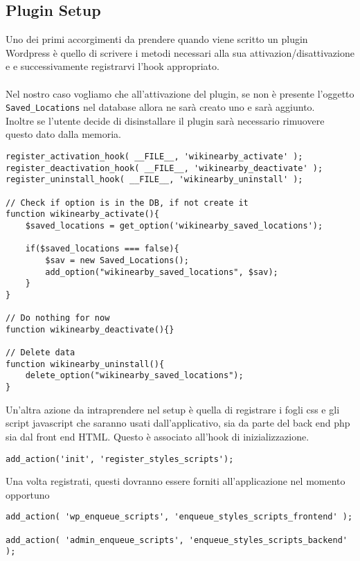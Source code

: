 \subsection*{Plugin Setup}
Uno dei primi accorgimenti da prendere quando viene scritto un plugin Wordpress è quello di scrivere i metodi necessari alla sua attivazion/disattivazione e e successivamente registrarvi l'hook appropriato.\\\\
Nel nostro caso  vogliamo che all'attivazione del plugin, se non è presente l'oggetto \texttt{Saved\_Locations} nel database allora ne sarà creato uno e sarà aggiunto. \\
Inoltre se l'utente decide di disinstallare il plugin sarà necessario rimuovere questo dato dalla memoria.\\
\begin{lstlisting}
register_activation_hook( __FILE__, 'wikinearby_activate' );
register_deactivation_hook( __FILE__, 'wikinearby_deactivate' );
register_uninstall_hook( __FILE__, 'wikinearby_uninstall' );

// Check if option is in the DB, if not create it
function wikinearby_activate(){
    $saved_locations = get_option('wikinearby_saved_locations');
	
    if($saved_locations === false){
        $sav = new Saved_Locations();
		add_option("wikinearby_saved_locations", $sav);
	}
}

// Do nothing for now
function wikinearby_deactivate(){}

// Delete data
function wikinearby_uninstall(){
	delete_option("wikinearby_saved_locations");
}
\end{lstlisting}

Un'altra azione da intraprendere nel setup è quella di registrare i fogli css e gli script javascript che saranno usati dall'applicativo, sia da parte del back end php sia dal front end HTML. Questo è associato all'hook di inizializzazione.
\begin{lstlisting}
add_action('init', 'register_styles_scripts');
\end{lstlisting}

Una volta registrati, questi dovranno essere forniti all'applicazione nel momento opportuno
\begin{lstlisting}
add_action( 'wp_enqueue_scripts', 'enqueue_styles_scripts_frontend' );

add_action( 'admin_enqueue_scripts', 'enqueue_styles_scripts_backend' );
\end{lstlisting}
